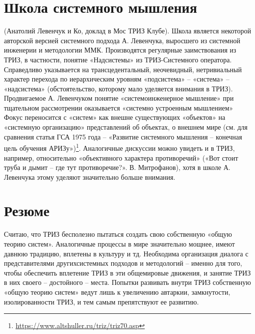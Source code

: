 \documentclass[11pt,a4paper]{article}
\begin{document}
\section{Школа системного мышления}
(Анатолий Левенчук и Ко, доклад в Мос ТРИЗ Клубе). Школа является некоторой
авторской версией системного подхода А. Левенчука, выросшего из системной
инженерии и методологии ММК. Производятся регулярные заимствования из ТРИЗ, в
частности, понятие «Надсистемы» из ТРИЗ-Системного оператора. Справедливо
указывается на трансцедентальный, неочевидный, нетривиальный характер перехода
по иерархическим уровням «подсистема» -- «система» -- «надсистема»
(обстоятельство, которому мало уделяется внимания в ТРИЗ). Продвигаемое
А. Левенчуком понятие «системоинженерное мышление» при тщательном рассмотрении
оказывается «системно устроенным мышлением» Фокус переносится с «систем» как
внешне существующих «объектов» на «системную организацию» представлений об
объектах, о внешнем мире (см. для сравнения статья ГСА 1975 года – «Развитие
системного мышления – конечная цель обучения
АРИЗу»)\footnote{\url{https://www.altshuller.ru/triz/triz70.asp}}. Аналогичные
дискуссии можно увидеть и в ТРИЗ, например, относительно «объективного
характера противоречий» («Вот стоит труба и дымит -- где тут противоречие?».
В. Митрофанов), хотя в школе А. Левенчука этому уделяют значительно больше
внимания.

\section{Резюме}
Считаю, что ТРИЗ бесполезно пытаться создать свою собственную «общую теорию
систем». Аналогичные процессы в мире значительно мощнее, имеют давнюю
традицию, вплетены в культуру и тд. Необходима организация диалога с
представителями другихсистемных подходов и методологий – именно для того,
чтобы обеспечить вплетение ТРИЗ в эти общемировые движения, и занятие ТРИЗ в
них своего – достойного – места. Попытки развивать внутри ТРИЗ собственную
«общую теорию систем» ведут лишь к увеличению автаркии, замкнутости,
изолированности ТРИЗ, и тем самым препятствуют ее развитию.
\end{document}
